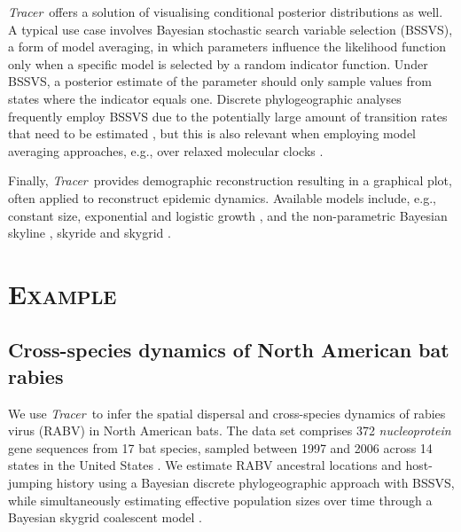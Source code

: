 \documentclass[webpdf,mynatbib,nosurname,nogrid,noCE,noMSC]{SYS}
\newcommand{\tracer}{\emph{Tracer}}
\begin{document}
\tracer\ offers a solution of visualising conditional posterior distributions as well.
A typical use case involves Bayesian stochastic search variable selection (BSSVS), a form of model averaging, in which parameters influence the likelihood function only when a specific model is selected by a random indicator function.
Under BSSVS, a posterior estimate of the parameter should only sample values from states where the indicator equals one.
Discrete phylogeographic analyses frequently employ BSSVS due to the potentially large amount of transition rates that need to be estimated \citep{Lemey2009}, but this is also relevant when employing model averaging approaches, e.g., over relaxed molecular clocks \citep{Li2012}.

Finally, \tracer\ provides demographic reconstruction resulting in a graphical plot, often applied to reconstruct epidemic dynamics.
Available models include, e.g., constant size, exponential and logistic growth \citep{drummond2002estimating},
and the non-parametric Bayesian skyline \citep{drummond2005bayesian,heledDrummond2008}, skyride \citep{minin2008smooth} and skygrid \citep{gill2012improving}.

\vspace{-0.7cm}

\section*{\textsc{Example}}

\subsection*{Cross-species dynamics of North American bat rabies}

We use \tracer\ to infer the spatial dispersal and cross-species dynamics of rabies virus (RABV) in North American bats.
The data set comprises 372 \textit{nucleoprotein} gene sequences from 17 bat species, sampled between 1997 and 2006 across 14 states in the United States \citep{Streicker,Faria2013}.
We estimate RABV ancestral locations and host-jumping history using a Bayesian discrete phylogeographic approach with BSSVS, while simultaneously estimating effective population sizes over time through a Bayesian skygrid coalescent model \citep{gill2012improving}.
\end{document}

